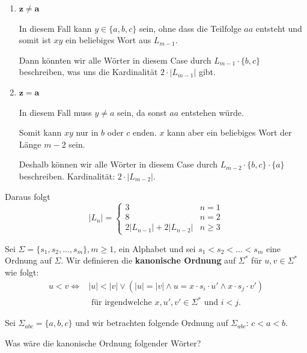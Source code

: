 \documentclass[a4paper, 11pt]{article}
\begin{document}
	\begin{enumerate}[label= (\alph*)]
		
		\item $\mathbf{z \neq a}$
		
		In diesem Fall kann $y \in \{a,b,c\}$ sein, ohne dass die Teilfolge $aa$ entsteht und somit ist $xy$ ein beliebiges Wort aus $L_{m-1}$. 
		
		Dann könnten wir alle Wörter in diesem Case durch $L_{m-1}\cdot \{b,c\}$ beschreiben, was uns die Kardinalität $2 \cdot |L_{m-1}|$ gibt.
		
		\item $\mathbf{z = a}$
		
		In diesem Fall muss $y \neq a$ sein, da sonst $aa$ entstehen würde. 
		
		Somit kann $xy$ nur in $b$ oder $c$ enden. $x$ kann aber ein beliebiges Wort der Länge $m-2$ sein. 
		
		Deshalb können wir alle Wörter in diesem Case durch $L_{m-2}\cdot\{b, c\} \cdot \{a\}$ beschreiben. Kardinalität: $2 \cdot |L_{m-2}|$.
	\end{enumerate}

    Daraus folgt $$|L_n| = \begin{cases}
        3 &  n = 1\\
        8 & n = 2\\
        2|L_{n-1}|+ 2|L_{n-2}| &n \geq 3
    \end{cases}$$

\vspace*{1cm}

	
	\begin{mainbox}{}
		Sei $\Sigma = \{s_1,s_2, ...,s_m\}, m \geq 1$, ein Alphabet und sei $s_1 < s_2 < ... <s_m$ eine Ordnung auf $\Sigma$. Wir definieren die \textbf{kanonische Ordnung} auf $\Sigma^*$ für $u, v \in \Sigma^*$ wie folgt:
		\begin{align*}
			u < v \iff &|u| < |v| \lor (|u| = |v| \land u = x\cdot s_i \cdot u' \land x \cdot s_j \cdot v') \\
			&\text{ für irgendwelche } x, u', v' \in \Sigma^* \text{ und } i < j. 
		\end{align*}
	\end{mainbox}



	Sei $\Sigma_{abc} = \{a, b, c\}$ und wir betrachten folgende Ordnung auf $\Sigma_{abc}$: $c < a < b$.

	Was wäre die kanonische Ordnung folgender Wörter?
\end{document}
